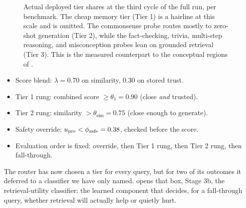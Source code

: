 \begin{figure}[htbp]
\centering
{}
\caption[Deployed per-benchmark tier shares at the third cycle]{Actual deployed tier
shares at the third cycle of the full run, per benchmark. The cheap memory tier
(Tier 1) is a hairline at this scale and is omitted. The commonsense probe routes
mostly to zero-shot generation (Tier 2), while the fact-checking, trivia, multi-step
reasoning, and misconception probes lean on grounded retrieval (Tier 3). This is the
measured counterpart to the conceptual regions of .}
\label{fig:tier-share}
\end{figure}

\begin{bythenumbers}
\begin{itemize}[leftmargin=1.3em, itemsep=1pt]
  \item Score blend: $\lambda = 0.70$ on similarity, $0.30$ on stored trust.
  \item Tier 1 rung: combined score $\ge \theta_1 = 0.90$ (close \emph{and} trusted).
  \item Tier 2 rung: similarity $> \theta_{\text{sim}} = 0.75$ (close enough to generate).
  \item Safety override: $u_{\text{pre}} < \phi_{\text{safe}} = 0.38$, checked before the score.
  \item Evaluation order is fixed: override, then Tier 1 rung, then Tier 2 rung, then fall-through.
\end{itemize}
\end{bythenumbers}

The router has now chosen a tier for every query, but for two of its outcomes it deferred
to a classifier we have only named.  opens that box, Stage 3b, the
retrieval-utility classifier: the learned component that decides, for a fall-through
query, whether retrieval will actually help or quietly hurt.
